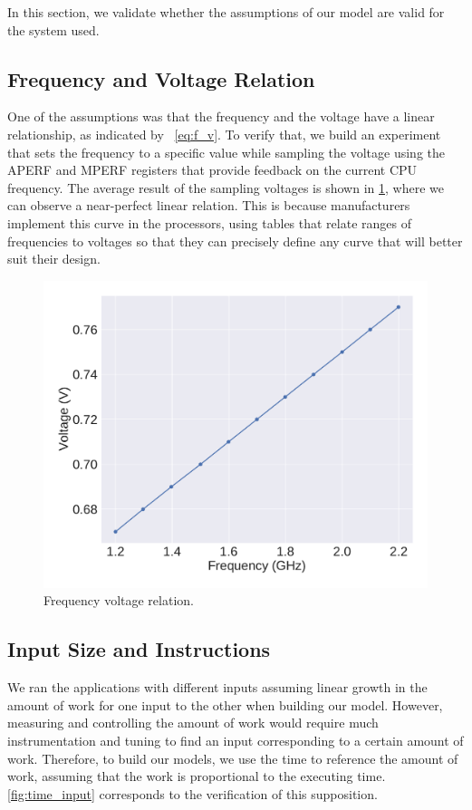 In this section, we validate whether the assumptions of our model are valid for the system used.

\subsection{Frequency and Voltage Relation} \label{subsec:ev_frequency_and_voltage Relation}
One of the assumptions was that the frequency and the voltage have a linear relationship, as indicated by ~\cref{eq:f_v}. To verify that, we build an experiment that sets the frequency to a specific value while sampling the voltage using the APERF and MPERF registers that provide feedback on the current CPU frequency. The average result of the sampling voltages is shown in  \cref{fig:freq_volt_rel}, where we can observe a near-perfect linear relation. This is because manufacturers implement this curve in the processors, using tables that relate ranges of frequencies to voltages so that they can precisely define any curve that will better suit their design.

\begin{figure}[H]
	\centering
	\captionsetup[subfigure]{justification=centering}
	\includegraphics[width=\columnwidth]{experiments/figures/freq_volt_rel.pdf}
	\caption{Frequency voltage relation.}
	\label{fig:freq_volt_rel}
\end{figure}

\subsection{Input Size and Instructions} \label{subsec:ev_input_size_and_instructions}
We ran the applications with different inputs assuming  linear growth in the amount of work for one input to the other when building our model. However, measuring and controlling the amount of work would require much instrumentation and tuning to find an input corresponding to a certain amount of work. Therefore, to build our models, we use the time to reference the amount of work, assuming that the work is proportional to the executing time. \cref{fig:time_input} corresponds to the verification of this supposition.


